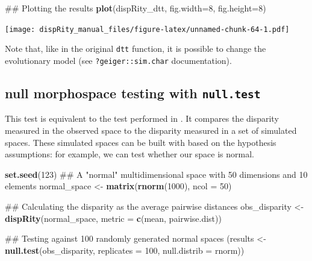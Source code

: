 \documentclass[]{book}
\newenvironment{Shaded}{\begin{snugshade}}{\end{snugshade}}
\newcommand{\KeywordTok}[1]{\textcolor[rgb]{0.13,0.29,0.53}{\textbf{#1}}}
\newcommand{\DataTypeTok}[1]{\textcolor[rgb]{0.13,0.29,0.53}{#1}}
\newcommand{\DecValTok}[1]{\textcolor[rgb]{0.00,0.00,0.81}{#1}}
\newcommand{\StringTok}[1]{\textcolor[rgb]{0.31,0.60,0.02}{#1}}
\newcommand{\NormalTok}[1]{#1}
\theoremstyle{definition}
\theoremstyle{definition}
\theoremstyle{definition}
\theoremstyle{remark}
\begin{document}
\begin{Shaded}
\begin{Highlighting}[]
\NormalTok{## Plotting the results}
\KeywordTok{plot}\NormalTok{(dispRity_dtt, }\DataTypeTok{fig.width=}\DecValTok{8}\NormalTok{, }\DataTypeTok{fig.height=}\DecValTok{8}\NormalTok{)}
\end{Highlighting}
\end{Shaded}

\texttt{[image: dispRity\_manual\_files/figure-latex/unnamed-chunk-64-1.pdf]}

Note that, like in the original \texttt{dtt} function, it is possible to
change the evolutionary model (see \texttt{?geiger::sim.char}
documentation).

\subsection{\texorpdfstring{null morphospace testing with
\texttt{null.test}}{null morphospace testing with null.test}}\label{null-morphospace-testing-with-null.test}

This test is equivalent to the test performed in \citet{diaz2016global}.
It compares the disparity measured in the observed space to the
disparity measured in a set of simulated spaces. These simulated spaces
can be built with based on the hypothesis assumptions: for example, we
can test whether our space is normal.

\begin{Shaded}
\begin{Highlighting}[]
\KeywordTok{set.seed}\NormalTok{(}\DecValTok{123}\NormalTok{)}
\NormalTok{## A "normal" multidimensional space with 50 dimensions and 10 elements}
\NormalTok{normal_space <-}\StringTok{ }\KeywordTok{matrix}\NormalTok{(}\KeywordTok{rnorm}\NormalTok{(}\DecValTok{1000}\NormalTok{), }\DataTypeTok{ncol =} \DecValTok{50}\NormalTok{)}

\NormalTok{## Calculating the disparity as the average pairwise distances}
\NormalTok{obs_disparity <-}\StringTok{ }\KeywordTok{dispRity}\NormalTok{(normal_space, }\DataTypeTok{metric =} \KeywordTok{c}\NormalTok{(mean, pairwise.dist))}

\NormalTok{## Testing against 100 randomly generated normal spaces}
\NormalTok{(results <-}\StringTok{ }\KeywordTok{null.test}\NormalTok{(obs_disparity, }\DataTypeTok{replicates =} \DecValTok{100}\NormalTok{, }\DataTypeTok{null.distrib =}\NormalTok{ rnorm))}
\end{Highlighting}
\end{Shaded}
\end{document}
